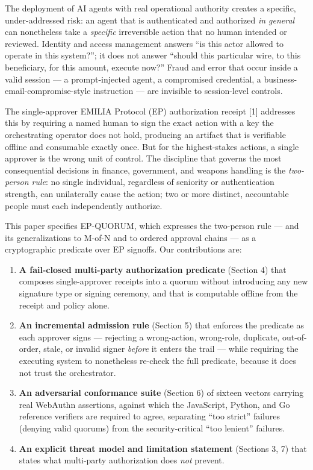 \documentclass[
  11pt,
]{article}
\newcounter{none} %
\providecommand{\tightlist}{%
  \setlength{\itemsep}{0pt}\setlength{\parskip}{0pt}}
\begin{document}
The deployment of AI agents with real operational authority creates a
specific, under-addressed risk: an agent that is authenticated and
authorized \emph{in general} can nonetheless take a \emph{specific}
irreversible action that no human intended or reviewed. Identity and
access management answers ``is this actor allowed to operate in this
system?''; it does not answer ``should this particular wire, to this
beneficiary, for this amount, execute now?'' Fraud and error that occur
inside a valid session --- a prompt-injected agent, a compromised
credential, a business-email-compromise-style instruction --- are
invisible to session-level controls.

The single-approver EMILIA Protocol (EP) authorization receipt {[}1{]}
addresses this by requiring a named human to sign the exact action with
a key the orchestrating operator does not hold, producing an artifact
that is verifiable offline and consumable exactly once. But for the
highest-stakes actions, a single approver is the wrong unit of control.
The discipline that governs the most consequential decisions in finance,
government, and weapons handling is the \emph{two-person rule}: no
single individual, regardless of seniority or authentication strength,
can unilaterally cause the action; two or more distinct, accountable
people must each independently authorize.

This paper specifies EP-QUORUM, which expresses the two-person rule ---
and its generalizations to M-of-N and to ordered approval chains --- as
a cryptographic predicate over EP signoffs. Our contributions are:

\begin{enumerate}
\def\labelenumi{\arabic{enumi}.}
\tightlist
\item
  \textbf{A fail-closed multi-party authorization predicate} (Section 4)
  that composes single-approver receipts into a quorum without
  introducing any new signature type or signing ceremony, and that is
  computable offline from the receipt and policy alone.
\item
  \textbf{An incremental admission rule} (Section 5) that enforces the
  predicate as each approver signs --- rejecting a wrong-action,
  wrong-role, duplicate, out-of-order, stale, or invalid signer
  \emph{before} it enters the trail --- while requiring the executing
  system to nonetheless re-check the full predicate, because it does not
  trust the orchestrator.
\item
  \textbf{An adversarial conformance suite} (Section 6) of sixteen vectors
  carrying real WebAuthn assertions, against which the JavaScript, Python,
  and Go reference verifiers are required to agree, separating ``too strict''
  failures (denying valid quorums) from the security-critical ``too
  lenient'' failures.
\item
  \textbf{An explicit threat model and limitation statement} (Sections
  3, 7) that states what multi-party authorization does \emph{not}
  prevent.
\end{enumerate}
\end{document}
